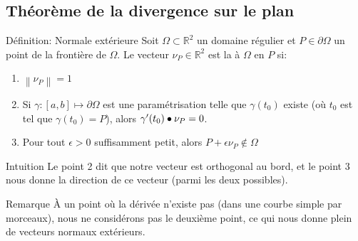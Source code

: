 \documentclass[a4paper]{article}
\begin{document}
\subsection{Théorème de la divergence sur le plan}
\begin{parag}{Définition: Normale extérieure}
    Soit $\Omega \subset \mathbb{R}^2$ un domaine régulier et $P \in \partial \Omega$ un point de la frontière de $\Omega$. Le vecteur $\nu_P \in \mathbb{R}^2$ est la  à $\Omega$ en $P$ si:
    \begin{enumerate}
        \item $\left\|\nu_P\right\| = 1$
        \item Si $\gamma: \left[a, b\right]\mapsto \partial \Omega$ est une paramétrisation telle que $\gamma\left(t_0\right)$ existe (où $t_0$ est tel que $\gamma\left(t_0\right) = P$), alors $\gamma'\left(t_0\right) \dotprod \nu_P = 0$.
        \item Pour tout $\epsilon > 0$ suffisamment petit, alors $P + \epsilon \nu_P \not\in \Omega$
    \end{enumerate}

    
    \begin{subparag}{Intuition}
        Le point 2 dit que notre vecteur est orthogonal au bord, et le point 3 nous donne la direction de ce vecteur (parmi les deux possibles).
    \end{subparag}
    
    \begin{subparag}{Remarque}
        À un point où la dérivée n'existe pas (dans une courbe simple par morceaux), nous ne considérons pas le deuxième point, ce qui nous donne plein de vecteurs normaux extérieurs.
    \end{subparag}
    
    
\end{parag}
\end{document}
